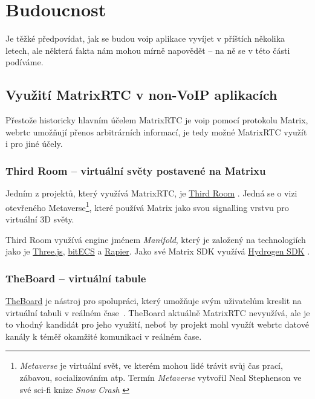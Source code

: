 \section{Budoucnost}\label{future}

Je těžké předpovídat, jak se budou \gls{voip} aplikace vyvíjet v příštích
několika letech, ale některá fakta nám mohou mírně napovědět -- na ně se v této
části podíváme.

\subsection{Využití MatrixRTC v non-VoIP aplikacích}

Přestože historicky hlavním účelem MatrixRTC je \gls{voip} pomocí protokolu
Matrix, \gls{webrtc} umožňují přenos arbitrárních informací, je tedy možné
MatrixRTC využít i pro jiné účely.

\subsubsection{Third Room -- virtuální světy postavené na
    Matrixu}\label{thirdroom}

Jedním z projektů, který využívá MatrixRTC, je \href{https://thirdroom.io}{Third
    Room} \parencite{ThirdRoom-Homepage}. Jedná se o vizi otevřeného
Metaverse\footnote{ \textit{Metaverse} je virtuální svět, ve kterém mohou
    lidé trávit svůj čas prací, zábavou, socializováním atp. Termín
    \textit{Metaverse} vytvořil Neal Stephenson ve své sci-fi knize \textit{Snow
        Crash}
    \parencite{TechTarget-WhatIsTheMetaverse}
}, které používá Matrix jako svou signalling vrstvu pro virtuální 3D světy.

Third Room využívá engine jménem \textit{Manifold}, který je založený na
technologiích jako je \href{https://threejs.org/}{Three.js},
\href{https://github.com/NateTheGreatt/bitECS}{bitECS}
a \href{https://rapier.rs/}{Rapier}. Jako své Matrix SDK využívá
\href{https://www.npmjs.com/package/hydrogen-view-sdk}{Hydrogen SDK}
\parencite{ThirdRoom-Homepage}.

\subsubsection{TheBoard -- virtuální tabule}

\href{https://github.com/toger5/TheBoard}{TheBoard} je nástroj pro spolupráci,
který umožňuje svým uživatelům kreslit na virtuální tabuli v reálném
čase~\parencite{GitHub-TheBoard}. TheBoard aktuálně MatrixRTC nevyužívá, ale je
to vhodný kandidát pro jeho využití, neboť by projekt mohl využít \gls{webrtc}
datové kanály k téměř okamžité komunikaci v reálném čase.

